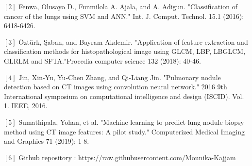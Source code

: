 \documentclass[12pt]{article}
\newcommand{\nd}{\noindent}
\begin{document}
\nd$[2]$   Fenwa, Olusayo D., Funmilola A. Ajala, and A. Adigun. "Classification of cancer of the lungs using SVM and ANN." Int. J.
 Comput. Technol. 15.1 (2016): 6418-6426.
 
\nd$[3]$ Öztürk, Şaban, and Bayram Akdemir. "Application of feature extraction and classification methods for histopathological image using GLCM, LBP, LBGLCM, GLRLM and SFTA."Procedia
computer science 132 (2018): 40-46.

\nd$[4]$ Jin, Xin-Yu, Yu-Chen Zhang, and Qi-Liang Jin. "Pulmonary nodule detection based on CT images using convolution neural network." 2016 9th International symposium on computational
intelligence and design (ISCID). Vol. 1. IEEE, 2016.

\nd$[5]$ Sumathipala, Yohan, et al. "Machine learning to predict lung nodule biopsy method using CT image features: A pilot study." Computerized Medical Imaging and Graphics 71 (2019): 1-8.

\nd$[6]$ Github repository : https://raw.githubusercontent.com/Mounika-Kajjam
                                            
\end{document}
